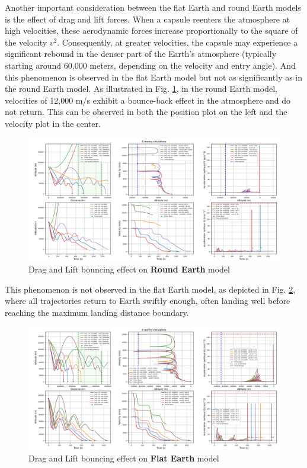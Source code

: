\documentclass[runningheads]{llncs}
\begin{document}
Another important consideration between the flat Earth and round Earth models is the effect of drag and lift forces. When a capsule reenters the atmosphere at high velocities, these aerodynamic forces increase proportionally to the square of the velocity \( v^2 \). Consequently, at greater velocities, the capsule may experience a significant rebound in the denser part of the Earth's atmosphere (typically starting around 60,000 meters, depending on the velocity and entry angle). 
And this phenomenon is observed in the flat Earth model but not as significantly as in the round Earth model. As illustrated in Fig. \ref{bounce_round_earth}, in the round Earth model, velocities of 12,000 m/s exhibit a bounce-back effect in the atmosphere and do not return. This can be observed in both the position plot on the left and the velocity plot in the center.

\begin{figure}
\centering
\includegraphics[width=1\textwidth]{images/bounce_round_earth.png}
\caption{Drag and Lift bouncing effect on \textbf{Round Earth} model} \label{bounce_round_earth}
\end{figure}

This phenomenon is not observed in the flat Earth model, as depicted in Fig. \ref{bounce_flat_earth}, where all trajectories return to Earth swiftly enough, often landing well before reaching the maximum landing distance boundary.


\begin{figure}
\centering
\includegraphics[width=1\textwidth]{images/bounce_flat_earth.png}
\caption{Drag and Lift bouncing effect on \textbf{Flat Earth} model} \label{bounce_flat_earth}
\end{figure}
\end{document}
